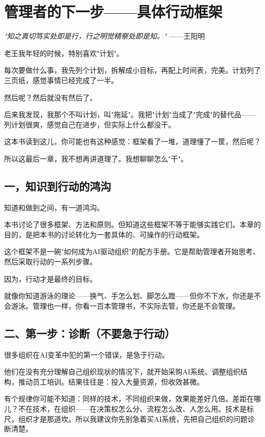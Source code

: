 \chapter{管理者的下一步——具体行动框架}


\textit{"知之真切笃实处即是行，行之明觉精察处即是知。"}
——王阳明


老王我年轻的时候，特别喜欢"计划"。

每次要做什么事，我先列个计划，拆解成小目标，再配上时间表，完美。计划列了三页纸，感觉事情已经完成了一半。

然后呢？然后就没有然后了。

后来我发现，我那个不叫计划，叫"拖延"。我把"计划"当成了"完成"的替代品——列计划很爽，感觉自己在进步，但实际上什么都没干。

这本书读到这儿，你可能也有这种感觉：框架看了一堆，道理懂了一筐，然后呢？

所以这最后一章，我不想再讲道理了。我想聊聊怎么"干"。

\section{一，知识到行动的鸿沟}


知道和做到之间，有一道鸿沟。

本书讨论了很多框架、方法和原则。但知道这些框架不等于能够实践它们。本章的目的，是把本书的讨论转化为一套具体的、可操作的行动框架。

这个框架不是一碗"如何成为AI驱动组织"的配方手册。它是帮助管理者开始思考、然后采取行动的一系列步骤。

因为，行动才是最终的目标。

就像你知道游泳的理论——换气、手怎么划、脚怎么蹬——但你不下水，你还是不会游泳。管理也一样，你看一百本管理书，不实际去管，你还是不会管理。

\section{二、第一步：诊断（不要急于行动）}


很多组织在AI变革中犯的第一个错误，是急于行动。

他们在没有充分理解自己组织现状的情况下，就开始采购AI系统、调整组织结构，推动员工培训。结果往往是：投入大量资源，但收效甚微。

有个规律你可能不知道：同样的技术，不同组织来做，效果能差好几倍。差距在哪儿？不在技术，在组织——在决策权怎么分、流程怎么改、人怎么用。技术是标尺，组织才是那道坎。所以我建议你先别急着买AI系统，先把自己组织的问题诊断清楚。

